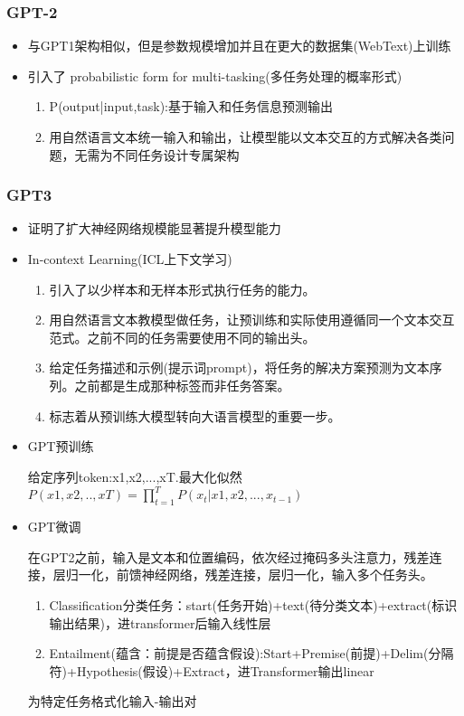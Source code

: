 \documentclass[UTF8]{ctexart}
\begin{document}
\subsubsection{GPT-2}
\begin{itemize}
    \item 与GPT1架构相似，但是参数规模增加并且在更大的数据集(WebText)上训练
    \item 引入了 probabilistic form for multi-tasking(多任务处理的概率形式)
    \begin{enumerate}
        \item P(output|input,task):基于输入和任务信息预测输出
        \item 用自然语言文本统一输入和输出，让模型能以文本交互的方式解决各类问题，无需为不同任务设计专属架构
    \end{enumerate}
\end{itemize}

\subsubsection{GPT3}
\begin{itemize}
    \item 证明了扩大神经网络规模能显著提升模型能力
    \item In-context Learning(ICL上下文学习)
    \begin{enumerate}
        \item 引入了以少样本和无样本形式执行任务的能力。
        \item 用自然语言文本教模型做任务，让预训练和实际使用遵循同一个文本交互范式。之前不同的任务需要使用不同的输出头。
        \item 给定任务描述和示例(提示词prompt)，将任务的解决方案预测为文本序列。之前都是生成那种标签而非任务答案。
        \item 标志着从预训练大模型转向大语言模型的重要一步。
    \end{enumerate}
\end{itemize}

\begin{itemize}
    \item GPT预训练
    
    给定序列token:x1,x2,...,xT.最大化似然$P(x1,x2,..,xT)=\prod \limits_{t=1}^{T}P(x_{t}|x1,x2,...,x_{t-1})$
    \item GPT微调
    
    在GPT2之前，输入是文本和位置编码，依次经过掩码多头注意力，残差连接，层归一化，前馈神经网络，残差连接，层归一化，输入多个任务头。
    \begin{enumerate}
        \item Classification分类任务：start(任务开始)+text(待分类文本)+extract(标识输出结果)，进transformer后输入线性层
        \item Entailment(蕴含：前提是否蕴含假设):Start+Premise(前提)+Delim(分隔符)+Hypothesis(假设)+Extract，进Transformer输出linear
    \end{enumerate}

    为特定任务格式化输入-输出对
\end{itemize}
\end{document}
